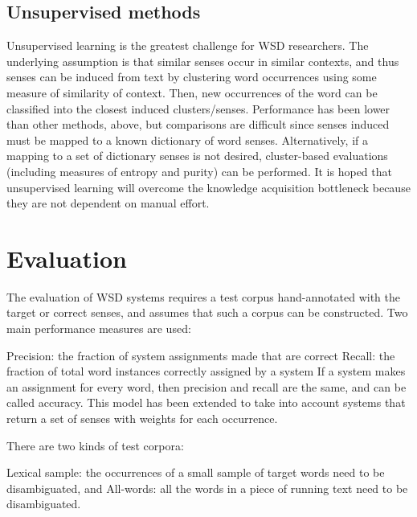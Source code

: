 \documentclass[11pt]{article}
\begin{document}
\nocite{Faralli:2012:NMF:2390948.2391109,Le:2006:IPS:2081346.2081404,Le:2008:SLI:1367140.1367220,Sanchez-de-Madariaga:2009:BYA:1460927.1461015}
\printbibliography
\endrefsection



\subsection{Unsupervised methods}

Unsupervised learning is the greatest challenge for WSD researchers. The underlying assumption is that similar senses occur in similar contexts, and thus senses can be induced from text by clustering word occurrences using some measure of similarity of context. Then, new occurrences of the word can be classified into the closest induced clusters/senses. Performance has been lower than other methods, above, but comparisons are difficult since senses induced must be mapped to a known dictionary of word senses. Alternatively, if a mapping to a set of dictionary senses is not desired, cluster-based evaluations (including measures of entropy and purity) can be performed. It is hoped that unsupervised learning will overcome the knowledge acquisition bottleneck because they are not dependent on manual effort.

\nocite{Chen:2009:FUW:1620754.1620759,Seo2004253,Yarowsky:1995:UWS:981658.981684,Zouaghi:2012:CIR:2400491.2400493}
\printbibliography
\endrefsection



\section{Evaluation}

The evaluation of WSD systems requires a test corpus hand-annotated with the target or correct senses, and assumes that such a corpus can be constructed. Two main performance measures are used:

	Precision: the fraction of system assignments made that are correct
	Recall: the fraction of total word instances correctly assigned by a system
If a system makes an assignment for every word, then precision and recall are the same, and can be called accuracy. This model has been extended to take into account systems that return a set of senses with weights for each occurrence.

There are two kinds of test corpora:

	Lexical sample: the occurrences of a small sample of target words need to be disambiguated, and
	All-words: all the words in a piece of running text need to be disambiguated.
\end{document}
